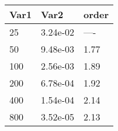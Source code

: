 \begin{tabular}{lll}
Var1 & Var2 & order \\ 
\hline 
25 & 3.24e-02 & ---- \\ 
50 & 9.48e-03 & 1.77 \\ 
100 & 2.56e-03 & 1.89 \\ 
200 & 6.78e-04 & 1.92 \\ 
400 & 1.54e-04 & 2.14 \\ 
800 & 3.52e-05 & 2.13 \\ 
\hline 
\end{tabular}
